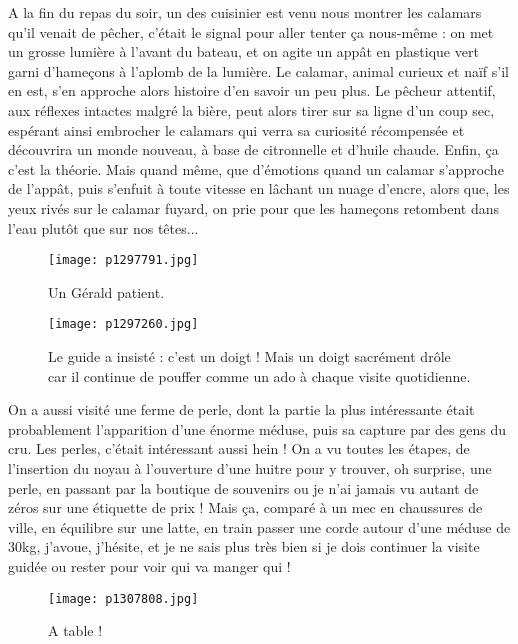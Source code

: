 \documentclass{book}
\begin{document}
A la fin du repas du soir, un des cuisinier est venu nous montrer les calamars qu'il venait de pêcher, c'était le signal pour aller tenter ça nous-même : on met un grosse lumière à l'avant du bateau, et on agite un appât en plastique vert garni d'hameçons à l'aplomb de la lumière. Le calamar, animal curieux et naïf s'il en est, s'en approche alors  histoire d'en savoir un peu plus. Le pêcheur attentif, aux réflexes intactes malgré la bière, peut alors tirer sur sa ligne d'un coup sec, espérant ainsi embrocher le calamars qui verra sa curiosité récompensée et découvrira un monde nouveau, à base de citronnelle et d'huile chaude. Enfin, ça c'est la théorie. Mais quand même, que d'émotions quand un calamar s'approche de l'appât, puis s’enfuit à toute vitesse  en lâchant un nuage d'encre, alors que, les yeux rivés sur le calamar fuyard, on prie pour que les hameçons retombent dans l'eau plutôt que sur nos têtes...


\begin{figure}[h]
\centering
\texttt{[image: p1297791.jpg]}
\caption*{Un Gérald patient.}
\end{figure}


\begin{figure}[h]
\centering
\texttt{[image: p1297260.jpg]}
\caption*{Le guide a insisté : c'est un doigt ! Mais un doigt sacrément drôle car il continue de pouffer comme un ado à chaque visite quotidienne.}
\end{figure}


On a aussi visité une ferme de perle, dont la partie la plus intéressante était probablement l'apparition d'une énorme méduse, puis sa capture par des gens du cru. Les perles, c'était intéressant aussi hein ! On a vu toutes les étapes, de l'insertion du noyau à l'ouverture d'une huitre pour y trouver, oh surprise, une perle, en passant par la boutique de souvenirs ou je n'ai jamais vu autant de zéros sur une étiquette de prix ! Mais ça, comparé à un mec en chaussures de ville, en équilibre sur une latte, en train passer une corde autour d'une méduse de 30kg, j'avoue, j'hésite, et je ne sais plus très bien si je dois continuer la visite guidée ou rester pour voir qui va manger qui !


\begin{figure}[h]
\centering
\texttt{[image: p1307808.jpg]}
\caption*{A table !}
\end{figure}
\end{document}
